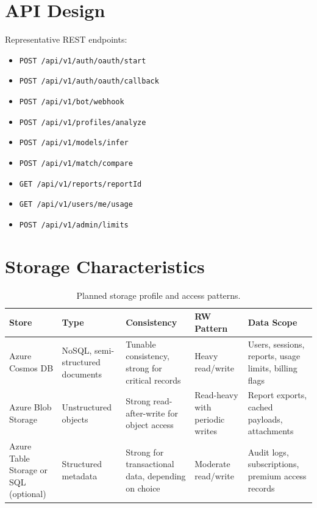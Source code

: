 \documentclass[11pt]{article}
\begin{document}
\section{API Design}
Representative REST endpoints:
\begin{itemize}[leftmargin=*]
  \item \texttt{POST /api/v1/auth/oauth/start}
  \item \texttt{POST /api/v1/auth/oauth/callback}
  \item \texttt{POST /api/v1/bot/webhook}
  \item \texttt{POST /api/v1/profiles/analyze}
  \item \texttt{POST /api/v1/models/infer}
  \item \texttt{POST /api/v1/match/compare}
  \item \texttt{GET /api/v1/reports/{reportId}}
  \item \texttt{GET /api/v1/users/me/usage}
  \item \texttt{POST /api/v1/admin/limits}
\end{itemize}

\section{Storage Characteristics}
\begin{table}[ht!]
\centering
\small
\begin{tabularx}{\textwidth}{p{2.8cm}X p{2.2cm}X X}
\toprule
\textbf{Store} & \textbf{Type} & \textbf{Consistency} & \textbf{RW Pattern} & \textbf{Data Scope} \\
\midrule
Azure Cosmos DB & NoSQL, semi-structured documents & Tunable consistency, strong for critical records & Heavy read/write & Users, sessions, reports, usage limits, billing flags \\
Azure Blob Storage & Unstructured objects & Strong read-after-write for object access & Read-heavy with periodic writes & Report exports, cached payloads, attachments \\
Azure Table Storage or SQL (optional) & Structured metadata & Strong for transactional data, depending on choice & Moderate read/write & Audit logs, subscriptions, premium access records \\
\bottomrule
\end{tabularx}
\caption{Planned storage profile and access patterns.}
\end{table}
\end{document}
